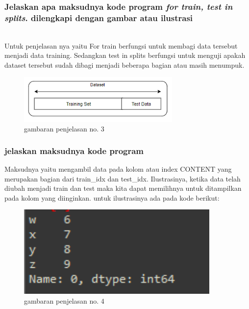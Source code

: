\subsubsection{Jelaskan apa maksudnya kode program \textit{for train, test in splits}. dilengkapi dengan gambar atau ilustrasi}
\hfill\\
Untuk penjelasan nya yaitu For train berfungsi untuk membagi data tersebut menjadi data training. Sedangkan test in splits berfungsi untuk menguji apakah dataset tersebut sudah dibagi menjadi beberapa bagian atau masih menumpuk.
\begin{figure}[H]
	\centering
	\includegraphics[width=8cm]{figures/1174083/figures7/2.png}
	\caption{gambaran penjelasan no. 3}
\end{figure}

\subsubsection{jelaskan maksudnya kode program}
Maksudnya yaitu mengambil data pada kolom atau index CONTENT yang merupakan bagian dari train\_idx dan test\_idx. Ilustrasinya, ketika data telah diubah menjadi train dan test maka kita dapat memilihnya untuk ditampilkan pada kolom yang diinginkan. untuk ilustrasinya ada pada kode berikut:

\begin{figure}[H]
	\centering
	\includegraphics[width=10cm]{figures/1174083/figures7/3.png}
	\caption{gambaran penjelasan no. 4}
\end{figure}

